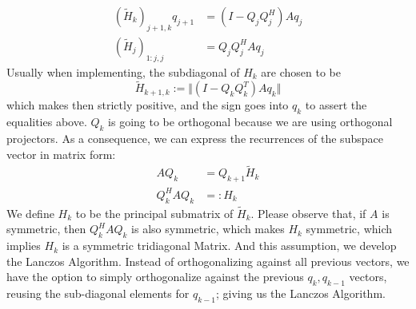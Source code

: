 \documentclass[]{article}
\theoremstyle{definition}
\begin{document}
            \begin{align}
                (\tilde{H}_k)_{j + 1, k}q_{j + 1}&= (I - Q_jQ_j^H)Aq_j
                \\
                (\tilde{H}_j)_{1:j, j} &= Q_jQ_j^HAq_j
            \end{align}
            Usually when implementing, the subdiagonal of $H_k$ are chosen to be 
            $$
                \tilde H_{k + 1, k} := \Vert (I - Q_kQ_k^T)Aq_k\Vert
            $$ 
            which makes then strictly positive, and the sign goes into $q_k$ to assert the equalities above. $Q_k$ is going to be orthogonal because we are using orthogonal projectors. As a consequence, we can express the recurrences of the subspace vector in matrix form: 
            \begin{align}
                AQ_{k} &= Q_{k + 1}\tilde{H}_k
                \\
                Q_{k}^HAQ_{k} &=: H_k
            \end{align}
            We define $H_k$ to be the principal submatrix of $\tilde{H}_k$. Please observe that, if $A$ is symmetric, then $Q^H_kAQ_k$ is also symmetric, which makes $H_k$ symmetric, which implies $H_k$ is a symmetric tridiagonal Matrix. And this assumption, we develop the Lanczos Algorithm. Instead of orthogonalizing against all previous vectors, we have the option to simply orthogonalize against the previous $q_k, q_{k - 1}$ vectors, reusing the sub-diagonal elements for $q_{k - 1}$; giving us the Lanczos Algorithm. 
\end{document}
